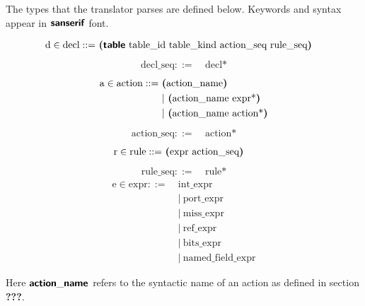 The types that the translator parses are defined below. Keywords and syntax appear in $\bm{\mathsf{{san serif}}}$ font.
\begin{mdframed}
\begin{align*} %
  \text{d} \in \text{decl} ::=~& \mathct{(table} \ \text{table\_id table\_kind action\_seq rule\_seq}\mathct{)}
\end{align*}
\begin{align*} %
  \text{decl\_seq} ::=~& \text{decl*}
\end{align*}
\begin{align*} %
  \text{a} \in \text{action} ::=~& \mathct{(}\text{action\_name}\mathct{)} \\
  & | \ \mathct{(}\text{action\_name expr*}\mathct{)} \\ 
  & | \ \mathct{(}\text{action\_name action*}\mathct{)}
\end{align*}
\begin{align*} %
  \text{action\_seq} ::=~& \text{action*}
\end{align*}
\begin{align*} %
  \text{r} \in \text{rule} ::=~& \mathct{(}\text{expr action\_seq}\mathct{)}
\end{align*}
\begin{align*} %
  \text{rule\_seq} ::=~& \text{rule*}
\end{align*}
\begin{align*} %
  \text{e} \in \text{expr} ::=~& \text{int\_expr} \\
  & | \ \text{port\_expr} \\
  & | \ \text{miss\_expr} \\
  & | \ \text{ref\_expr} \\
  & | \ \text{bits\_expr} \\
  & | \ \text{named\_field\_expr}
\end{align*}
\end{mdframed}
Here $\bm{\mathsf{{action\_name}}}$ refers to the syntactic name of an action as defined in section \textbf{???}.

